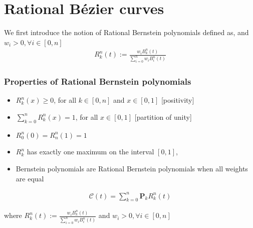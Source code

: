 \section{Rational B\'ezier curves}
We first introduce the notion of Rational Bernstein polynomials defined as,  and $w_i > 0, \forall i \in \left[0, n \right]$ 
\begin{align}
  R_k^n(t) := \frac{w_i B_k^n(t)}{\sum_{i=0}^n w_i B_i^n(t)}
  \label{eq:rational-bernstein}
\end{align}

\subsubsection*{Properties of Rational Bernstein polynomials}
\begin{itemize}
  \item $R_k^n(x) \ge 0$, for all $k \in \left[0, n \right]$ and $x \in \left[ 0, 1 \right]$ \hfill [positivity] 
  \item $\sum_{k=0}^n R_k^n(x) = 1$, for all $x \in \left[ 0, 1 \right]$ \hfill [partition of unity] 
  \item $R_0^n(0) = R_n^n(1) = 1$ 
  \item $R_k^n$ has exactly one maximum on the interval $\left[ 0, 1 \right]$, 
  \item Bernstein polynomials are Rational Bernstein polynomials when all weights are equal
\end{itemize}

\begin{definition}

\begin{align}
  \mathcal{C}(t) = \sum_{k=0}^n \mathbf{P}_k R_k^n(t) 
  \label{eq:bezier-curve}
\end{align}

where $R_k^n(t) := \frac{w_i B_k^n(t)}{\sum_{i=0}^n w_i B_i^n(t)}$ and $w_i > 0, \forall i \in \left[0, n \right]$ 
  
\end{definition}

